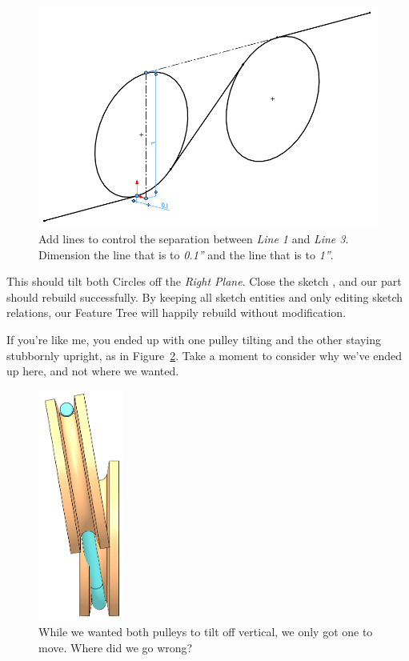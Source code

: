 \begin{figure}[H]
\begin{center}
  \includegraphics[width=5in]{images/figures/pulley-tilt-lines.png}
\end{center}
\caption{Add lines to control the separation between \emph{Line 1} and \emph{Line 3}.
Dimension the line that is  to \emph{0.1''} and the line that is
 to \emph{1''}.
\label{fig:pulley-tilt-lines}}

\end{figure}

This should tilt both
Circles off the \emph{Right Plane}. Close the sketch
, and our part should rebuild
successfully. By keeping all sketch entities and only editing sketch relations,
our Feature Tree will happily rebuild without modification.

If you're like me, you ended up with one pulley tilting and the other staying
stubbornly upright, as in Figure~\ref{fig:pulley-not-tilted}. Take a moment to
consider why we've ended up here, and not where we wanted.

\begin{figure}[H]
\begin{center}
  \includegraphics[height=3in]{images/figures/pulley-not-tilted.png}
\end{center}
\caption{While we wanted both pulleys to tilt off vertical, we only got one to move.
Where did we go wrong? \label{fig:pulley-not-tilted}}

\end{figure}

